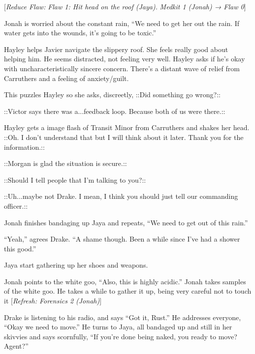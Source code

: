 {[}\textit{Reduce Flaw: }\textit{ {\color[RGB]{255,0,0}Flaw 1: Hit head on the roof (Jaya).} }\textit{  Medkit 1 (Jonah) → Flaw 0}{]}

Jonah is worried about the constant rain, ``We need to get her out the rain.  If water gets into the wounds, it's going to be toxic.''



Hayley helps Javier navigate the slippery roof.  She feels really good about helping him.  He seems distracted, not feeling very well.  Hayley asks if he's okay with uncharacteristically sincere concern.  There's a distant wave of relief from Carruthers and a feeling of anxiety/guilt.

This puzzles Hayley so she asks, discreetly,  {\color[RGB]{230,145,56}::Did something go wrong?::}  {\color[RGB]{255,153,0} } 

 {\color[RGB]{153,0,255}::Victor says there was a...feedback loop.  Because both of us were there.:: } 

Hayley gets a image flash of Transit Minor from Carruthers and shakes her head.   {\color[RGB]{230,145,56}::Oh.  I don't understand that but I will think about it later. Thank you for the information.::}  {\color[RGB]{255,153,0} } 

 {\color[RGB]{153,0,255}::Morgan is glad the situation is secure.:: } 

 {\color[RGB]{230,145,56}::Should I tell people that I'm talking to you?::}  {\color[RGB]{255,153,0} } 

 {\color[RGB]{153,0,255}::Uh...maybe not Drake.  I mean, I think you should just tell our commanding officer.:: } 



Jonah finishes bandaging up Jaya and repeats, ``We need to get out of this rain.''

``Yeah,'' agrees Drake.  ``A shame though.  Been a while since I've had a shower this good.''

Jaya start gathering up her shoes and weapons.

Jonah points to the white goo, ``Also, this is highly acidic.''  Jonah takes samples of the white goo.  He takes a while to gather it up, being very careful not to touch it {[}\textit{Refresh: Forensics 2 (Jonah)}{]}

Drake is listening to his radio, and says ``Got it, Rust.''  He addresses everyone, ``Okay we need to move.''  He turns to Jaya, all bandaged up and still in her skivvies and says scornfully, ``If you're done being naked, you ready to move?  Agent?''



